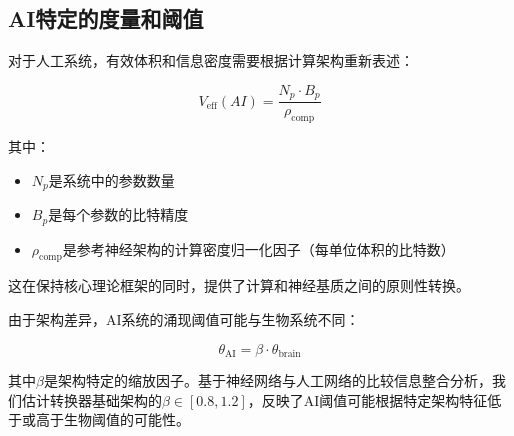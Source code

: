 \documentclass[12pt]{article}
\begin{document}
\subsection{AI特定的度量和阈值}

对于人工系统，有效体积和信息密度需要根据计算架构重新表述：

\begin{equation}
V_{\text{eff}}(AI) = \frac{N_p \cdot B_p}{\rho_{\text{comp}}}
\end{equation}

其中：
\begin{itemize}
    \item $N_p$是系统中的参数数量
    \item $B_p$是每个参数的比特精度
    \item $\rho_{\text{comp}}$是参考神经架构的计算密度归一化因子（每单位体积的比特数）
\end{itemize}

这在保持核心理论框架的同时，提供了计算和神经基质之间的原则性转换。

由于架构差异，AI系统的涌现阈值可能与生物系统不同：

\begin{equation}
\theta_{\text{AI}} = \beta \cdot \theta_{\text{brain}}
\end{equation}

其中$\beta$是架构特定的缩放因子。基于神经网络与人工网络的比较信息整合分析\cite{tononi2016,oizumi2014}，我们估计转换器基础架构的$\beta \in [0.8, 1.2]$，反映了AI阈值可能根据特定架构特征低于或高于生物阈值的可能性。
\end{document}
